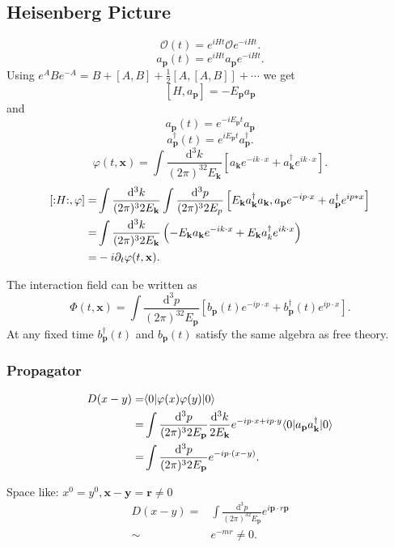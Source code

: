 \subsection{Heisenberg Picture}
\[
  \mathcal{O}(t)=e^{iHt}\mathcal{O}e^{-iHt}
.\]
\[
  a_{\mathbf{p}}(t)=e^{iHt}a_{\mathbf{p}}e^{-iHt}.
\] 
Using $e^{A}Be^{-A}=B+\left[ A,B \right] +\frac{1}{2}\left[ A,\left[ A,B \right]  \right]+\cdots $ we get 
\[
\left[ H,a_{\mathbf{p}} \right] =-E_{\mathbf{p}}a_{\mathbf{p}}
\] 
and
\[
  a_{\mathbf{p}}(t)=e^{-iE_{\mathbf{p}}t}a_{\mathbf{p}}
\] 
\[
  a_{\mathbf{p}}^{\dagger}\left( t \right) =e^{iE_{\mathbf{p}}t}a_{\mathbf{p}}^{\dagger}.
\]
\[
  \varphi(t,\mathbf{x})=\int \frac{\mathrm{d}^3k}{(2\pi)^32E_{\mathbf{k}}}\left[ a_{\mathbf{k}}e^{-ik\cdot x}+a_{\mathbf{k}}^{\dagger}e^{ik\cdot x} \right] 
.\]
\begin{align*}
  \left[ :\mathrel{H}:,\varphi \right] =& \int \frac{\mathrm{d}^3k}{(2\pi)^32E_{\mathbf{k}}}\int\frac{\mathrm{d}^3p}{(2\pi)^32E_{p}}\left[ E_{\mathbf{k}}a_{\mathbf{k}}^{\dagger}a_{\mathbf{k}},a_{\mathbf{p}}e^{-ip\cdot x}+a_{\mathbf{p}}^{\dagger}e^{ip*x} \right] \\
  =& \int \frac{\mathrm{d}^3k}{(2\pi)^32E_{\mathbf{k}}}\left( -E_{\mathbf{k}}a_{\mathbf{k}}e^{-ik\cdot x}+E_{\mathbf{k}}a_{k}^{\dagger}e^{ik\cdot x} \right) \\
  =& -i\partial_t\varphi(t,\mathbf{x})
.\end{align*}

The interaction field can be written as
\[
  \Phi(t,\mathbf{x})=\int \frac{\mathrm{d}^3p}{(2\pi)^32E_{\mathbf{p}}}\left[ b_{\mathbf{p}}(t)e^{-ip\cdot x}+b_{\mathbf{p}}^{\dagger}(t)e^{ip\cdot x} \right] 
.\]
At any fixed time $b_{\mathbf{p}}^{\dagger}(t)$ and $b_{\mathbf{p}}(t)$ satisfy the same algebra as free theory.
\subsubsection*{Propagator}
\begin{align*}
  D(x-y)=&\langle0\rvert\varphi(x)\varphi(y)\lvert0\rangle\\
  =&\int \frac{\mathrm{d}^3p}{(2\pi)^32E_{\mathbf{p}}}\frac{\mathrm{d}^{3}k}{2E_{\mathbf{k}}}e^{-ip\cdot x+ip\cdot y}\langle0\rvert a_{\mathbf{p}}a_{\mathbf{k}}^{\dagger}\lvert0\rangle\\
  =&\int \frac{\mathrm{d}^3p}{(2\pi)^32E_{\mathbf{p}}}e^{-ip\cdot (x-y)}
.\end{align*}

Space like: $x^{0}=y^{0},\mathbf{x}-\mathbf{y}=\mathbf{r}\neq 0$
\begin{align*}
  D(x-y)=&\int \frac{\mathrm{d}^3p}{(2\pi)^32E_{\mathbf{p}}}e^{i\mathbf{p}\cdot r\mathbf{p}}\\
  \sim& e^{-mr}\neq 0
.\end{align*}


